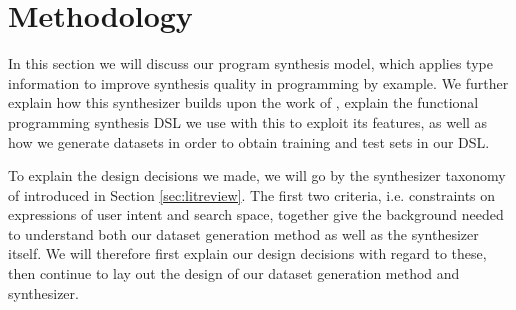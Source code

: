 \documentclass{article} %
\begin{document}




\section{Methodology} %

In this section we will discuss our program synthesis model,
which applies type information to improve synthesis quality in programming by example.
We further explain how this synthesizer builds upon the work of \citet{nsps},
explain the functional programming synthesis DSL we use with this to exploit its features,
as well as how we generate datasets in order to obtain training and test sets in our DSL.

To explain the design decisions we made,
we will go by the synthesizer taxonomy of \citet{gulwani2017program} introduced in Section \ref{sec:litreview}.
The first two criteria, i.e. constraints on expressions of user intent and search space,
together give the background needed to understand both our dataset generation method as well as the synthesizer itself.
We will therefore first explain our design decisions with regard to these,
then continue to lay out the design of our dataset generation method and synthesizer.
\end{document}
